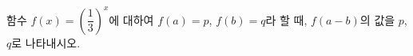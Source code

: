 함수 $f(x)=\left(\dfrac{1}{3}\right)^{x}$에 대하여 $f(a)=p$, $f(b)=q$라 할 때, $f(a-b)$의 값을 $p$, $q$로 나타내시오.
